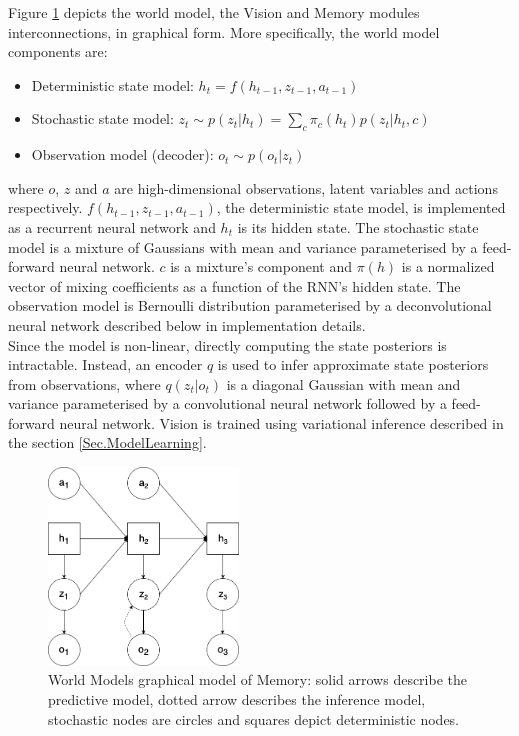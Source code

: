 Figure \ref{Fig.WorldModelsPGM} depicts the world model, the Vision and Memory modules interconnections, in graphical form. More specifically, the world model components are:
\begin{itemize}
\item Deterministic state model:             $h_t = f(h_{t-1}, z_{t-1}, a_{t-1})$
\item Stochastic state model:                $z_t \sim p(z_t|h_t) = \sum_c\pi_c(h_t)p(z_t|h_t, c)$
\item Observation model (decoder):           $o_t \sim p(o_t|z_t)$
\end{itemize}
where $o$, $z$ and $a$ are high-dimensional observations, latent variables and actions respectively. $f(h_{t-1}, z_{t-1}, a_{t-1})$, the deterministic state model, is implemented as a recurrent neural network and $h_t$ is its hidden state. The stochastic state model is a mixture of Gaussians with mean and variance parameterised by a feed-forward neural network. $c$ is a mixture's component and $\pi(h)$ is a normalized vector of mixing coefficients as a function of the RNN's hidden state. The observation model is Bernoulli distribution parameterised by a deconvolutional neural network described below in implementation details. \\
Since the model is non-linear, directly computing the state posteriors is intractable. Instead, an encoder $q$ is used to infer approximate state posteriors from observations, where $q(z_t | o_t)$ is a diagonal Gaussian with mean and variance parameterised by a convolutional neural network followed by a feed-forward neural network. Vision is trained using variational inference described in the section \ref{Sec.ModelLearning}.

\begin{figure}[H]
\includegraphics[width=0.45\textwidth,keepaspectratio]{figures/WorldModels/prob_graph_model.png}
\caption[World Models graphical model of Memory]{World Models graphical model of Memory: solid arrows describe the predictive model, dotted arrow describes the inference model, stochastic nodes are circles and squares depict deterministic nodes.}
\label{Fig.WorldModelsPGM}
\end{figure}

